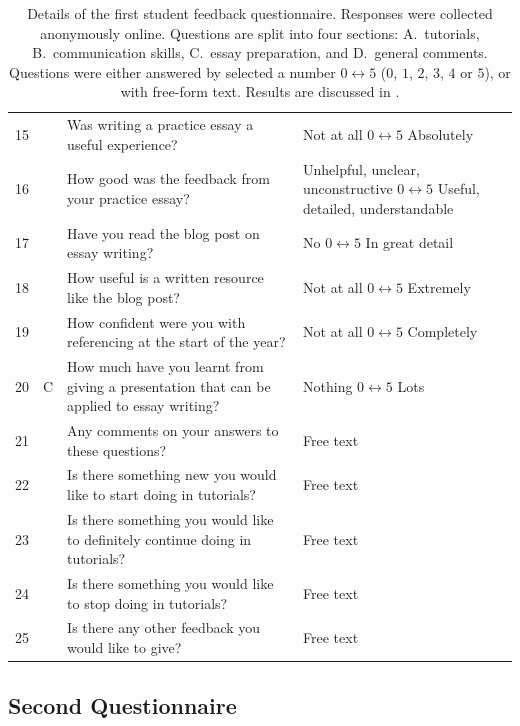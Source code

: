 \begin{table}
\begin{tabular}{c c p{2in} p{2in}}
\midrule
15 & \multirow{15}{*}{C} & Was writing a practice essay a useful experience? & Not at all $0 \leftrightarrow 5$ Absolutely \\
16 &	& How good was the feedback from your practice essay? & Unhelpful, unclear, unconstructive $0 \leftrightarrow 5$ Useful, detailed, understandable \\
17 &	& Have you read the blog post on essay writing? & No $0 \leftrightarrow 5$ In great detail \\
18 &	& How useful is a written resource like the blog post? & Not at all $0 \leftrightarrow 5$ Extremely \\
19 &	& How confident were you with referencing at the start of the year? & Not at all $0 \leftrightarrow 5$ Completely \\
20 &	& How much have you learnt from giving a presentation that can be applied to essay writing? & Nothing $0 \leftrightarrow 5$ Lots \\
21 &	& Any comments on your answers to these questions? & Free text \\
\midrule
22 & \multirow{8}{*}{D} & Is there something new you would like to start doing in tutorials? & Free text \\
23 &	& Is there something you would like to definitely continue doing in tutorials? & Free text \\
24 &	& Is there something you would like to stop doing in tutorials? & Free text \\
25 &	& Is there any other feedback you would like to give? & Free text \\
 \bottomrule
\end{tabular}
\caption{Details of the first student feedback questionnaire. Responses were collected anonymously online. Questions are split into four sections: A.\ tutorials, B.\ communication skills, C.\ essay preparation, and D.\ general comments. Questions were either answered by selected a number $0 \leftrightarrow 5$ ($0$, $1$, $2$, $3$, $4$ or $5$), or with free-form text. Results are discussed in .}\label{tab:form1}
\end{table}

\subsection{Second Questionnaire}\label{sec:form2}

